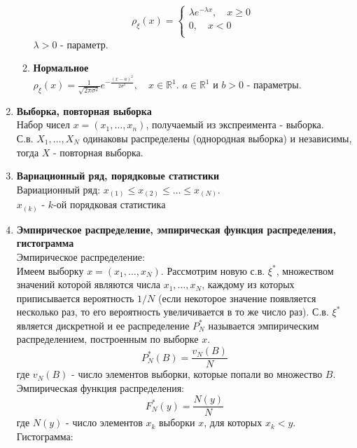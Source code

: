 \documentclass[A4]{article}
\begin{document}
\begin{enumerate}
\begin{enumerate}
\begin{equation}
		\rho_{\xi}(x)=\left\{\begin{array}{l}
		\lambda e^{-\lambda x},\quad x\ge 0\\
		0,\quad x<0\\
		\end{array}\right.
		\end{equation}
		$\lambda>0$ - параметр. 
		\item \textbf{Нормальное}\\
		$\rho_{\xi}(x)=\frac{1}{\sqrt{2\pi\sigma^2}}e^{-\frac{(x-a)^2}{2\sigma^2}},\quad x\in \mathbb{R}^1$. $a\in \mathbb{R}^1$ и $b>0$ - параметры.
	\end{enumerate}
	\item \textbf{Выборка, повторная выборка}\\
	Набор чисел $x=(x_1,\ldots,x_n)$, получаемый из экспреимента - выборка.\\
	С.в. $X_1,\ldots,X_N$ одинаковы распределены (однородная выборка) и независимы, тогда $X$ - повторная выборка.
	\item \textbf{Вариационный ряд, порядковые статистики}\\
	Вариационный ряд: $x_{(1)}\le x_{(2)}\le\ldots\le x_{(N)}$.\\
	$x_{(k)}$ - $k$-ой порядковая статистика
	\item \textbf{Эмпирическое распределение, эмпирическая функция распределения, гистограмма}\\
	Эмпирическое распределение:\\
	Имеем выборку $x=(x_1,\ldots,x_N)$. Рассмотрим новую с.в. $\xi^*$, множеством значений которой являются числа $x_1,\ldots,x_N$, каждому из которых приписывается вероятность $1/N$ (если некоторое значение появляется несколько раз, то его вероятность увеличивается в то же число раз). С.в. $\xi^*$ является дискретной и ее распределение $P_N^*$ называется эмпирическим распределением, построенным по выборке $x$.\\
	\begin{equation}
	P_N^*(B)=\frac{v_N(B)}{N}
	\end{equation}
	где $v_N(B)$ - число элементов выборки, которые попали во множество $B$. 
	Эмпирическая функция распределения:\\
	\begin{equation}
	F_N^*(y)=\frac{N(y)}{N}
	\end{equation}
	где $N(y)$ - число элементов $x_k$ выборки $x$, для которых $x_k<y$. \\
	Гистограмма:\\

\end{enumerate}
\end{document}
